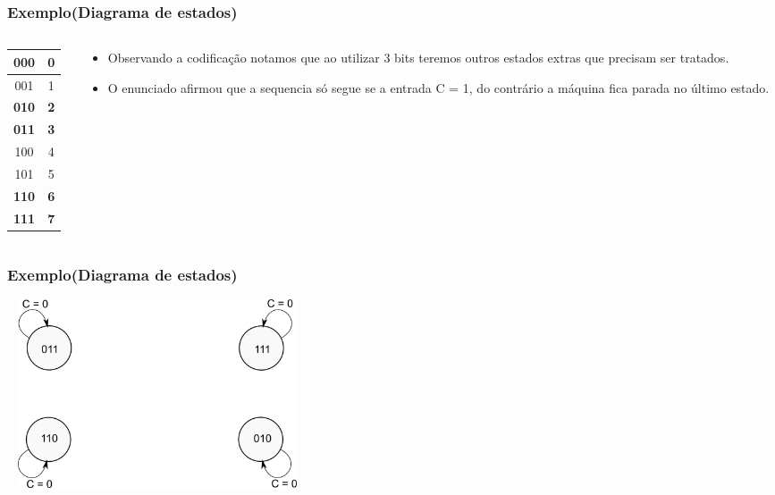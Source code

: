 \documentclass{beamer}
\begin{document}
\begin{frame}
 \frametitle{Exemplo(Diagrama de estados)}
 \begin{columns}[c]

  \begin{column}{1cm}
   \begin{tabular}{|c|c|}
    \hline
    000 & 0 \\
    \hline
    001 & 1 \\
    \hline
    \textbf{010} & \textbf{2} \\
    \hline
    \textbf{011} & \textbf{3} \\
    \hline
    100 & 4 \\
    \hline
    101 & 5 \\
    \hline
    \textbf{110} & \textbf{6} \\
    \hline
    \textbf{111} & \textbf{7} \\
    \hline
   \end{tabular}
  \end{column} 

  \begin{column}{8cm}
    \begin{itemize}
    \item Observando a codificação notamos que ao utilizar 3 bits teremos outros estados extras que precisam ser tratados.\pause
    \item O enunciado afirmou que a sequencia só segue se a entrada C = 1, do contrário a máquina fica parada no último estado.
    \end{itemize}
  \end{column} 
 \end{columns}
\end{frame}

\begin{frame}
  \frametitle{Exemplo(Diagrama de estados)}
  \begin{center}
    \includegraphics[height = 2.2in, width =3.5in]
      {images/exemplo_projeto_1.png}
  \end{center}
\end{frame}
\end{document}
